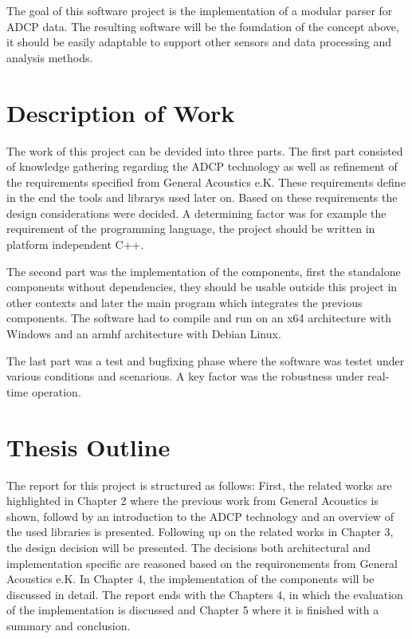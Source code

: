 The goal of this software project is the implementation of a modular parser for ADCP data. The resulting software will be the foundation of the concept above, it should be easily adaptable to support other sensors and data processing and analysis methods. 

\section{Description of Work}
The work of this project can be devided into three parts. The first part consisted of knowledge gathering regarding the ADCP technology as well as refinement of the requirements specified from General Acoustics e.K. These requirements define in the end the tools and librarys used later on. Based on these requirements the design considerations were decided. A determining factor was for example the requirement of the programming language, the project should be written in platform independent C++. %

The second part was the implementation of the components, first the standalone components without dependencies, they should be usable outside this project in other contexts and later the main program which integrates the previous components. The software had to compile and run on an x64 architecture with Windows and an armhf architecture with Debian Linux.

The last part was a test and bugfixing phase where the software was testet under various conditions and scenarious. A key factor was the robustness under real-time operation.  %

\section{Thesis Outline}
The report for this project is structured as follows: First, the related works are highlighted in Chapter 2 where the previous work from General Acoustics is shown, followd by an introduction to the ADCP technology and an overview of the used libraries is presented. Following up on the related works in Chapter 3, the design decision will be presented. The decisions both architectural and implementation specific are reasoned based on the requironements from General Acoustics e.K. In Chapter 4, the implementation of the components will be discussed in detail. The report ends with the Chapters 4, in which the evaluation of the implementation is discussed and Chapter 5 where it is finished with a summary and conclusion.

